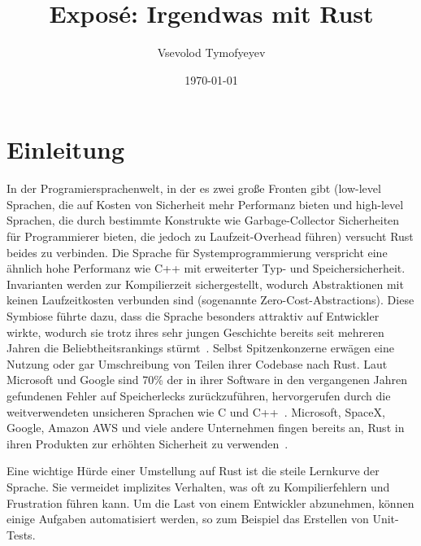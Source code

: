 \documentclass{article}
\newcounter{myWeekNum}
\newcommand{\myWeek}{\themyWeekNum
    \stepcounter{myWeekNum}
    \ifnum\themyWeekNum=53
         \setcounter{myWeekNum}{1}
    \else\fi
}
\begin{document}
\setcounter{myWeekNum}{25}
\ganttset{%
calendar week text={\myWeek{}}%
}


\title{Exposé: Irgendwas mit Rust}
\author{Vsevolod Tymofyeyev}
\date{\today}
\maketitle

\section{Einleitung}

In der Programiersprachenwelt, in der es zwei große Fronten gibt (low-level Sprachen, die auf Kosten von Sicherheit mehr Performanz bieten und high-level Sprachen, die durch bestimmte Konstrukte wie Garbage-Collector Sicherheiten für Programmierer bieten, die jedoch zu Laufzeit-Overhead führen) versucht Rust beides zu verbinden. Die Sprache für Systemprogrammierung verspricht eine ähnlich hohe Performanz wie C++ mit erweiterter Typ- und Speichersicherheit. Invarianten werden zur Kompilierzeit sichergestellt, wodurch Abstraktionen mit keinen Laufzeitkosten verbunden sind (sogenannte Zero-Cost-Abstractions). Diese Symbiose führte dazu, dass die Sprache besonders attraktiv auf Entwickler wirkte, wodurch sie trotz ihres sehr jungen Geschichte bereits seit mehreren Jahren die Beliebtheitsrankings stürmt~\cite{StackOverflow2020}. Selbst Spitzenkonzerne erwägen eine Nutzung oder gar Umschreibung von Teilen ihrer Codebase nach Rust. Laut Microsoft und Google sind 70\% der in ihrer Software in den vergangenen Jahren gefundenen Fehler auf Speicherlecks zurückzuführen, hervorgerufen durch die weitverwendeten unsicheren Sprachen wie C und C++~\cite{Microsoft2019MemoryBugs, RustInAndroid}. Microsoft, SpaceX, Google, Amazon AWS und viele andere Unternehmen fingen bereits an, Rust in ihren Produkten zur erhöhten Sicherheit zu verwenden~\cite{MicrosoftJoinsRust, AmazonLovesRust, RustInAndroid, GoogleRustFoundation}. 

Eine wichtige Hürde einer Umstellung auf Rust ist die steile Lernkurve der Sprache. Sie vermeidet implizites Verhalten, was oft zu Kompilierfehlern und Frustration führen kann. Um die Last von einem Entwickler abzunehmen, können einige Aufgaben automatisiert werden, so zum Beispiel das Erstellen von Unit-Tests. 
\end{document}
